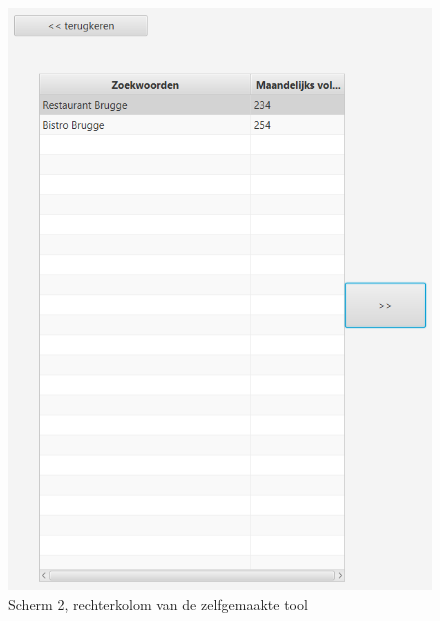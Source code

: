 \begin{figure}[h!]
\centering
\includegraphics[width=\linewidth]{img/scherm2linkerkant.PNG}
\caption{Scherm 2, rechterkolom van de zelfgemaakte tool}
\end{figure}
